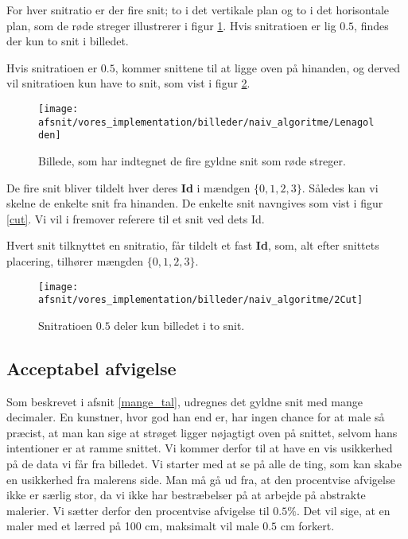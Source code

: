 {\begin{definition}
	For hver snitratio er der fire snit; to i det vertikale plan og to i
	det horisontale plan, som de røde streger illustrerer i figur
    \ref{lenasnit2}. Hvis snitratioen er lig $0.5$, findes der kun to
    snit i billedet.
\end{definition}

Hvis snitratioen er $0.5$, kommer snittene til at ligge oven på hinanden,
og derved vil snitratioen kun have to snit, som vist i figur \ref{2Cut}.

\begin{figure}[!h]
    \centering
    \texttt{[image: afsnit/vores\_implementation/billeder/naiv\_algoritme/Lenagolden]}
    \caption[]{Billede, som har indtegnet de fire gyldne snit som røde
    streger.}
    \label{lenasnit2}
\end{figure}

De fire snit bliver tildelt hver deres \textbf{Id} i mændgen $\{0,1,2,3\}$.
Således kan vi skelne de enkelte snit fra hinanden. De enkelte snit
navngives som vist i figur \ref{cut}. Vi vil i fremover referere til et
snit ved dets Id.

\begin{definition}
    Hvert snit tilknyttet en snitratio, får tildelt et fast \textbf{Id},
    som, alt efter snittets placering, tilhører mængden $\{0,1,2,3\}$.
\end{definition}

\begin{figure}[h]
    \centering
    \texttt{[image: afsnit/vores\_implementation/billeder/naiv\_algoritme/2Cut]}
    \caption[]{Snitratioen $0.5$ deler kun billedet i to snit.}
    \label{2Cut}
\end{figure}

\subsection{Acceptabel afvigelse}
Som beskrevet i afsnit \ref{mange_tal}, udregnes det gyldne snit med
mange decimaler. En kunstner, hvor god han end er, har ingen chance for
at male så præcist, at man kan sige at strøget ligger nøjagtigt oven på
snittet, selvom hans intentioner er at ramme snittet. Vi kommer derfor
til at have en vis usikkerhed på de data vi får fra billedet. Vi starter
med at se på alle de ting, som kan skabe en usikkerhed fra malerens
side. Man må gå ud fra, at den procentvise afvigelse ikke er særlig
stor, da vi ikke har bestræbelser på at arbejde på abstrakte malerier.
Vi sætter derfor den procentvise afvigelse til $0.5 \%$. Det vil sige,
at en maler med et lærred på 100 cm, maksimalt vil male $0.5$ cm
forkert.

}
